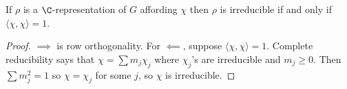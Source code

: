 \documentclass[a4paper]{article}
\begin{document}
\begin{corollary}
  If \(\rho\) is a \(\C\)-representation of \(G\) affording \(\chi\) then \(\rho\) is irreducible if and only if \(\langle \chi, \chi \rangle = 1\).
\end{corollary}

\begin{proof}
  \(\implies\) is row orthogonality. For \(\impliedby\), suppose \(\langle \chi, \chi \rangle = 1\). Complete reducibility says that \(\chi = \sum m_j \chi_j\) where \(\chi_j\)'s are irreducible and \(m_j \geq 0\). Then \(\sum m_j^2 = 1\) so \(\chi = \chi_j\) for some \(j\), so \(\chi\) is irreducible.
\end{proof}




\printindex
\end{document}
